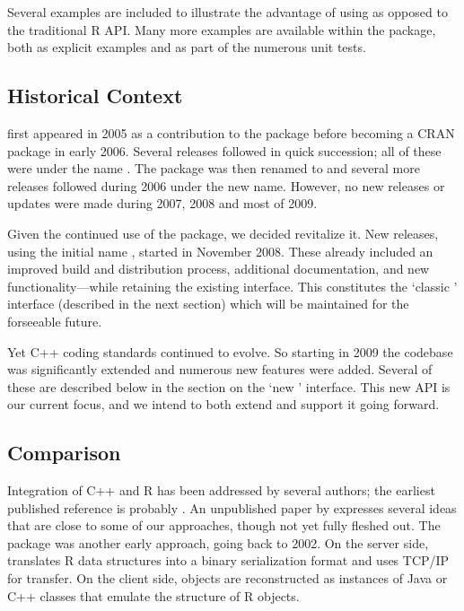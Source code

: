 Several examples are included to illustrate the advantage of using 
as opposed to the traditional R API. Many more examples are available within
the package, both as explicit examples and as part of the numerous unit tests.


\subsection{Historical Context}

 first appeared in 2005 as a contribution to the 
package \citep{eddelbuettelkhan09:rquantlib} before becoming a CRAN
package in early 2006. Several releases followed in quick succession; all of
these were under the name . The package was then renamed to
 and several more releases followed during 2006 under the
new name.  However, no new releases or updates were made during 2007, 2008
and most of 2009.

Given the continued use of the package, we decided revitalize it. New
releases, using the initial name , started in November 2008. These
already included an improved build and distribution process, additional
documentation, and new functionality---while retaining the existing
interface.  This constitutes the `classic ' interface (described in
the next section) which will be maintained for the forseeable future.

Yet C++ coding standards continued to evolve. So starting in 2009 the
codebase was significantly extended and numerous new features were added.
Several of these are described below in the section on the `new
' interface. This new API is our current focus, and we intend to
both extend and support it going forward.

\subsection{Comparison}

Integration of C++ and R has been addressed by several authors; the earliest
published reference is probably \cite{batesdebroy01:cppclasses}.
An unpublished paper by \cite{javagailemanly07:r_cpp} expresses several ideas
that are close to some of our approaches, though not yet fully fleshed out.
%
The  package \citep{cran:Rserve} was another early approach,
going back to 2002. On the server side,  translates R data
structures into a binary serialization format and uses TCP/IP for
transfer. On the client side, objects are reconstructed as instances of Java
or C++ classes that emulate the structure of R objects. 

